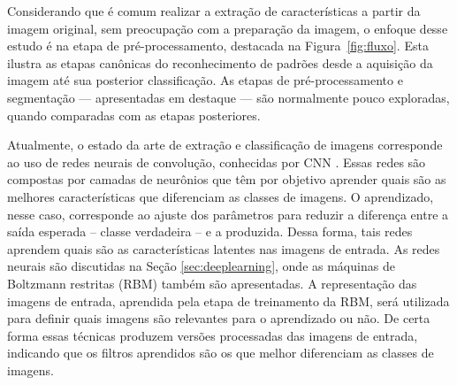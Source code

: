 
Considerando que é comum realizar a extração de características a partir da imagem original, sem preocupação com a preparação da imagem, o enfoque desse estudo é na etapa de pré-processamento, destacada na Figura~\ref{fig:fluxo}. Esta ilustra as etapas canônicas do reconhecimento de padrões desde a aquisição da imagem até sua posterior classificação. As etapas de pré-processamento e segmentação --- apresentadas em destaque --- são normalmente pouco exploradas, quando comparadas com as etapas posteriores.

Atualmente, o estado da arte de extração e classificação de imagens corresponde ao uso de redes neurais de convolução, conhecidas por CNN \cite{Schmidhuber2014}. Essas redes são compostas por camadas de neurônios que têm por objetivo aprender quais são as melhores características que diferenciam as classes de imagens. O aprendizado, nesse caso, corresponde ao ajuste dos parâmetros para reduzir a diferença entre a saída esperada -- classe verdadeira -- e a produzida. Dessa forma, tais redes aprendem quais são as características latentes nas imagens de entrada. As redes neurais são discutidas na Seção \ref{sec:deeplearning}, onde as máquinas de Boltzmann restritas (RBM) também são apresentadas. A representação das imagens de entrada, aprendida pela etapa de treinamento da RBM, será utilizada para definir quais imagens são relevantes para o aprendizado ou não. De certa forma essas técnicas produzem versões processadas das imagens de entrada, indicando que os filtros aprendidos são os que melhor diferenciam as classes de imagens.

